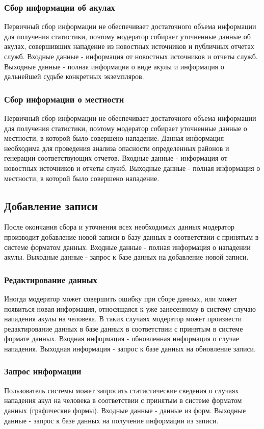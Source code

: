 \documentclass[russian,utf8,simple,emptystyle]{eskdtext}
\begin{document}
\subsubsection{Сбор информации об акулах}
Первичный сбор информации не обеспечивает достаточного объема информации для получения статистики, поэтому модератор собирает уточненные данные об акулах, совершивших нападение из новостных источников и публичных отчетах служб. Входные данные - информация от новостных источников и отчеты служб. Выходные данные - полная информация о виде акулы и информация о дальнейшей судьбе конкретных экземпляров.

\subsubsection{Сбор информации о местности}
Первичный сбор информации не обеспечивает достаточного объема информации для получения статистики, поэтому модератор собирает уточненные данные о местности, в которой было совершено нападение. Данная информация необходима для проведения анализа опасности определенных районов и генерации соответствующих отчетов. Входные данные - информация от новостных источников и отчеты служб. Выходные данные - полная информация о местности, в которой было совершено нападение.

\subsection{Добавление записи}
После окончания сбора и уточнения всех необходимых данных модератор производит добавление новой записи в базу данных в соответствии с принятым в системе форматом данных. Входные данные - полная информация о нападении акулы. Выходные данные - запрос к базе данных на добавление новой записи.

\subsubsection{Редактирование данных}
Иногда модератор может совершить ошибку при сборе данных, или может появиться новая информация, относящаяся к уже занесенному в систему случаю нападения акулы на человека. В таких случаях модератор может произвести редактирование данных в базе данных в соответствии с принятым в системе формате данных. Входная информация - обновленная информация о случае нападения. Выходная информация - запрос к базе данных на обновление записи.

\subsubsection{Запрос информации}
Пользователь системы может запросить статистические сведения о случаях нападения акул на человека в соответствии с принятым в системе форматом данных (графические формы). Входные данные - данные из форм. Выходные данные - запрос к базе данных на получение информации из записи.
\end{document}
